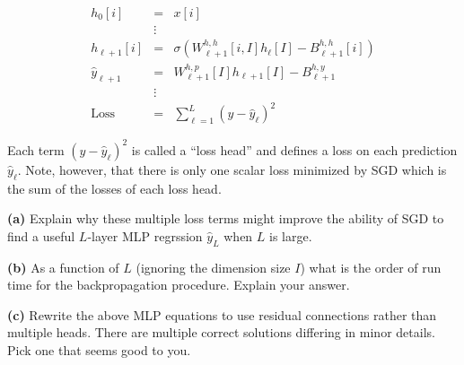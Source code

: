\documentclass{article}
\newcommand{\solution}[1]{}
\begin{document}
\begin{eqnarray*}
  h_0[i] & = & x[i] \\
  & \vdots & \\
  h_{\ell+1}[i] & = & \sigma(W^{h,h}_{\ell+1}[i,I]h_\ell[I] - B^{h,h}_{\ell+1}[i]) \\
  \hat{y}_{\ell +1} & = & W^{h,p}_{\ell+1}[I]h_{\ell+1}[I]- B^{h,y}_{\ell+1} \\
  & \vdots & \\
  \mathrm{Loss} & = & \sum_{\ell = 1}^L (y - \hat{y}_\ell)^2
\end{eqnarray*}

Each term $(y-\hat{y}_\ell)^2$ is called a ``loss head'' and defines a loss on each prediction $\hat{y}_{\ell}$.
Note, however, that there is only one scalar loss minimized by SGD which is the sum of the losses of each loss head.

\medskip
{\bf (a)} Explain why these multiple loss terms might improve the ability of SGD to find a useful $L$-layer MLP regrssion $\hat{y}_L$ when $L$ is large.

\solution{
  SGD on deep networks with the loss term only occuring at the final layer is not generally effective because the lower layers
  never get meaninful gradients.  Placing loss functions near the lower layers will cause the lower hidden layers to have meaningful
  gradients and produce informative features.
}

\medskip
{\bf (b)} As a function of $L$ (ignoring the dimension size $I$) what is the order of run time for the backpropagation procedure.
Explain your answer.

\solution{It is $O(L)$ --- linear in $L$.  Backpropagation loops over the assignments of the program and takes time proportional to the size of the program.
  Back-propagation over the final sum of losses produces a gradient for each prediction $\hat{y}_\ell$ which can be used as we back-propagate over the
  earlier assignments.
}

\medskip
{\bf (c)} Rewrite the above MLP equations to use residual connections rather than multiple heads.  There are multiple correct solutions differing in minor details.  Pick one that seems
good to you.

\solution{
\begin{eqnarray*}
  h_0[i] & = & x[i] \\
  & \vdots & \\
  \tilde{h}_{\ell+1}[i] & = & \sigma(W^{h,h}_{\ell+1}[i,I]h_\ell[I] - B^{h,h}_{\ell+1}[i]) \\
  h_{\ell+1}[i] & = & \tilde{h}_{\ell+1}[i] + h_\ell[i] \\
  & \vdots & \\
  \hat{y} & = & W^{h,y}[I]h_L[I]- B^{h,y} \\
  \mathrm{Loss} & = & (y - \hat{y})^2
\end{eqnarray*}
}
\end{document}
